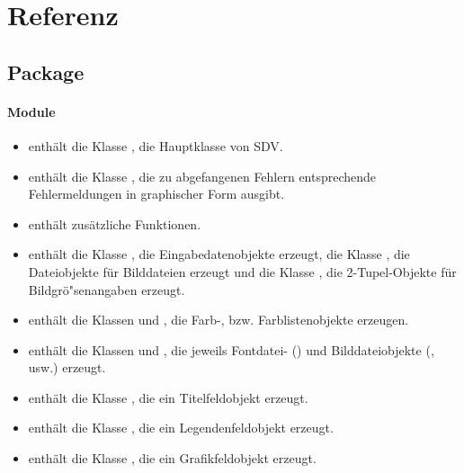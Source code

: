 \section{Referenz}

\subsection{Package}

\paragraph{Module}

\begin{itemize}
\item {} enth\"alt die Klasse , die
  Hauptklasse von SDV.
  
\item {} enth\"alt die Klasse , die
  zu abgefangenen Fehlern entsprechende Fehlermeldungen in graphischer
  Form ausgibt.
  
\item {} enth\"alt zus\"atzliche Funktionen.
  
\item {} enth\"alt die Klasse , die
  Eingabedatenobjekte erzeugt, die Klasse , die
  Dateiobjekte f\"ur Bilddateien erzeugt und die Klasse
  , die 2-Tupel-Objekte f\"ur Bildgr\"o"senangaben
  erzeugt.
  
\item {} enth\"alt die Klassen 
  und , die Farb-, bzw. Farblistenobjekte
  erzeugen.
  
\item {} enth\"alt die Klassen  und
  , die jeweils Fontdatei- () und
  Bilddateiobjekte (,  usw.) erzeugt.
  
\item {} enth\"alt die Klasse , die
  ein Titelfeldobjekt erzeugt.
  
\item {} enth\"alt die Klasse ,
  die ein Legendenfeldobjekt erzeugt.
  
\item {} enth\"alt die Klasse ,
  die ein Grafikfeldobjekt erzeugt.
\end{itemize}


